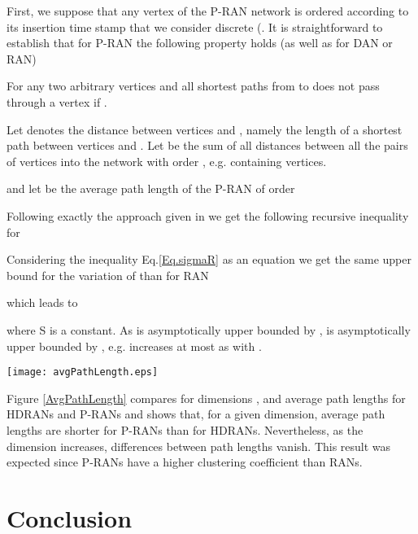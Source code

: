 \documentclass[11pt]{iopart}
\begin{document}
First, we suppose that any vertex of the P-RAN network is ordered according to its insertion time stamp  that we consider discrete (. It is straightforward to establish that for P-RAN the following property holds (as well as for DAN or RAN)

For any two arbitrary vertices  and  all shortest paths from  to  does not pass through a vertex  if . 

Let  denotes the distance between vertices  and , namely the length of a shortest path between vertices  and . Let  be the sum of all distances between all the pairs of vertices into the network with order , e.g. containing  vertices.



and let  be the average path length of the P-RAN of order  



Following exactly the approach given in \cite{zhang-2006a} we get the following recursive inequality for 



Considering the inequality Eq.\ref{Eq.sigmaR} as an equation we get the same upper bound for the variation of  than for RAN



which leads to



where S is a constant. As  is asymptotically upper bounded by  ,  is asymptotically upper bounded by , e.g.  increases at most as  with .

\begin{figure*}[htbp]
\centering
\texttt{[image: avgPathLength.eps]}
\caption{Average path length in RANs and P-RANs}
\label{AvgPathLength}
\end{figure*}


Figure \ref{AvgPathLength} compares for dimensions ,  and  average path lengths for HDRANs and P-RANs and shows that, for a given dimension, average path lengths are shorter for P-RANs than for HDRANs. Nevertheless, as the dimension increases, differences between path lengths vanish. This result was expected since P-RANs have a higher clustering coefficient than RANs.

\section{Conclusion}
\end{document}
